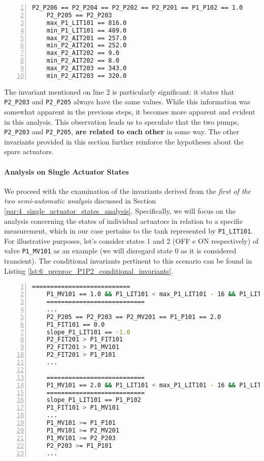 \begin{lstlisting}[language=bash, numbers=left, caption=General Invariants for PLC1-2, label=lst:6_preproc_P1P2_general_invariants]
	P2_P206 == P2_P204 == P2_P202 == P2_P201 == P1_P102 == 1.0
	P2_P205 == P2_P203
	max_P1_LIT101 == 816.0
	min_P1_LIT101 == 489.0
	max_P2_AIT201 == 257.0
	min_P2_AIT201 == 252.0
	max_P2_AIT202 == 9.0
	min_P2_AIT202 == 8.0
	max_P2_AIT203 == 343.0
	min_P2_AIT203 == 320.0
\end{lstlisting}

The invariant mentioned on line 2 is particularly significant: it states that \texttt{P2\_P203} and \texttt{P2\_P205} always have the same values. While this information was somewhat apparent in the previous steps, it becomes more apparent and evident in this analysis. This observation leads us to speculate that the two pumps, \texttt{P2\_P203} and \texttt{P2\_P205}, \textbf{are related to each other} in some way. The other invariants provided in this section further reinforce the hypotheses about the spare actuators.

\vfill

\paragraph{Analysis on Single Actuator States}
\label{par:6_P1P2_single_act_states}
We proceed with the examination of the invariants derived from the \textit{first of the two semi-automatic analysis} discussed in Section \ref{par:4_single_actuator_states_analysis}. Specifically, we will focus on the analysis concerning the states of individual actuators in relation to a specific measurement, which in our case pertains to the tank represented by \texttt{P1\_LIT101}. For illustrative purposes, let's consider states 1 and 2 (OFF e ON respectively) of valve \texttt{P1\_MV101} as an example (we will disregard state 0 as it is considered transient). The conditional invariants pertinent to this scenario can be found in Listing \ref{lst:6_preproc_P1P2_conditional_invariants}.

\begin{lstlisting}[language=bash, numbers=left, caption=Conditional Invariants for states 1 and 2 of \texttt{P1\_MV101}, label=lst:6_preproc_P1P2_conditional_invariants]
	===========================
	P1_MV101 == 1.0 && P1_LIT101 < max_P1_LIT101 - 16 && P1_LIT101 > min_P1_LIT101 + 15 
	===========================
	...
	P2_P205 == P2_P203 == P2_MV201 == P1_P101 == 2.0
	P1_FIT101 == 0.0
	slope_P1_LIT101 == -1.0
	P2_FIT201 > P1_FIT101
	P2_FIT201 > P1_MV101
	P2_FIT201 > P1_P101
	...
	
	===========================
	P1_MV101 == 2.0 && P1_LIT101 < max_P1_LIT101 - 16 && P1_LIT101 > min_P1_LIT101 + 15 
	===========================
	slope_P1_LIT101 == P1_P102
	P1_FIT101 > P1_MV101
	...
	P1_MV101 >= P1_P101
	P1_MV101 >= P2_MV201
	P1_MV101 >= P2_P203
	P2_P203 >= P1_P101
	...
\end{lstlisting}

